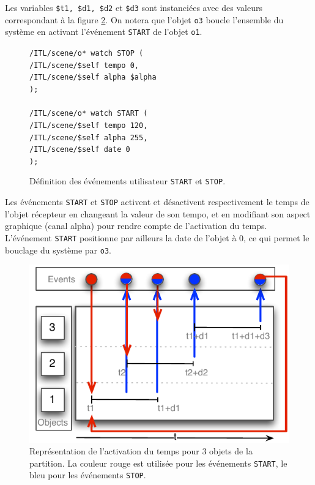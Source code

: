 \documentclass{article}
\newcommand{\OSC}[1]	{{\fontsize{9pt}{9pt} \selectfont\texttt{#1}}}
\newcommand{\tab}{\hspace*{4mm}}
\newcommand{\sample}[1]		{\vspace{-0.2em}\begin{center}\colorbox{mygrey}{\begin{minipage}[t]{0.98\columnwidth} {\small \texttt{#1}}\end{minipage}}\end{center}}
\begin{document}
Les variables \OSC{\$t1, \$d1, \$d2} et \OSC{\$d3} sont instanciées avec des valeurs correspondant à la figure \ref{fig:sample}. On notera que l'objet \OSC{o3} boucle l'ensemble du système en activant l'événement \OSC{START} de l'objet \OSC{o1}.

\begin{figure}[h]
   \centering
\sample{/ITL/scene/o* watch STOP ( \\
   \tab/ITL/scene/\$self tempo 0,\\
   \tab/ITL/scene/\$self alpha \$alpha	\\
);\\
\\
/ITL/scene/o* watch START ( \\
   \tab/ITL/scene/\$self tempo 120,\\
   \tab/ITL/scene/\$self alpha 255,\\
   \tab/ITL/scene/\$self date 0\\
);
}
   \caption{Définition des événements utilisateur \OSC{START} et \OSC{STOP}.}
   \label{fig:ex2}
\end{figure}


Les événements \OSC{START} et \OSC{STOP} activent et désactivent respectivement le temps de l'objet récepteur en changeant la valeur de son tempo, et en modifiant son aspect graphique (canal alpha) pour rendre compte de l'activation du temps. L'événement \OSC{START} positionne par ailleurs la date de l'objet à 0, ce qui permet le bouclage du système par \OSC{o3}.
\begin{figure}[h]
   \centering
   \includegraphics[width=0.8\columnwidth]{imgs/sample}
   \caption{Représentation de l'activation du temps pour 3 objets de la partition. La couleur rouge est utilisée pour les événements \OSC{START}, le bleu pour les événements \OSC{STOP}.}
   \label{fig:sample}
\end{figure}
\end{document}
